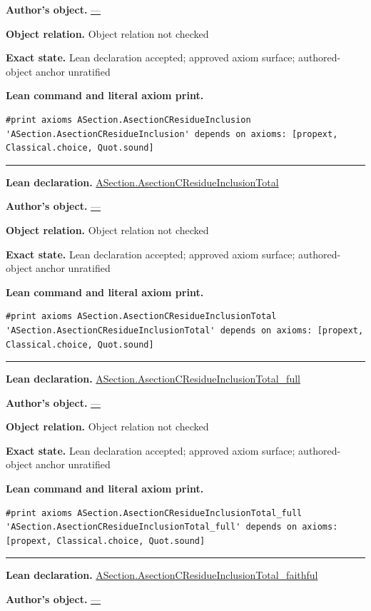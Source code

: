 \documentclass[11pt]{article}
\theoremstyle{plain}
\theoremstyle{definition}
\theoremstyle{remark}
\begin{document}
\begin{tcolorbox}[provenancecard,title={45. Definition - The residue subdiagram and its inclusion},title after break={45. Definition - The residue subdiagram and its inclusion (continued)}]
\par\textbf{Author's object.} \url{—}
\par\textbf{Object relation.} Object relation not checked
\par\textbf{Exact state.} Lean declaration accepted; approved axiom surface; authored-object anchor unratified
\par\smallskip\textbf{Lean command and literal axiom print.}
\begin{Verbatim}[breaklines=true,breakanywhere=true,fontsize=\small]
#print axioms ASection.AsectionCResidueInclusion
'ASection.AsectionCResidueInclusion' depends on axioms: [propext, Classical.choice, Quot.sound]
\end{Verbatim}
\medskip\hrule\medskip
\textbf{Lean declaration.} \url{ASection.AsectionCResidueInclusionTotal}
\par\textbf{Author's object.} \url{—}
\par\textbf{Object relation.} Object relation not checked
\par\textbf{Exact state.} Lean declaration accepted; approved axiom surface; authored-object anchor unratified
\par\smallskip\textbf{Lean command and literal axiom print.}
\begin{Verbatim}[breaklines=true,breakanywhere=true,fontsize=\small]
#print axioms ASection.AsectionCResidueInclusionTotal
'ASection.AsectionCResidueInclusionTotal' depends on axioms: [propext, Classical.choice, Quot.sound]
\end{Verbatim}
\medskip\hrule\medskip
\textbf{Lean declaration.} \url{ASection.AsectionCResidueInclusionTotal_full}
\par\textbf{Author's object.} \url{—}
\par\textbf{Object relation.} Object relation not checked
\par\textbf{Exact state.} Lean declaration accepted; approved axiom surface; authored-object anchor unratified
\par\smallskip\textbf{Lean command and literal axiom print.}
\begin{Verbatim}[breaklines=true,breakanywhere=true,fontsize=\small]
#print axioms ASection.AsectionCResidueInclusionTotal_full
'ASection.AsectionCResidueInclusionTotal_full' depends on axioms: [propext, Classical.choice, Quot.sound]
\end{Verbatim}
\medskip\hrule\medskip
\textbf{Lean declaration.} \url{ASection.AsectionCResidueInclusionTotal_faithful}
\par\textbf{Author's object.} \url{—}

\end{tcolorbox}
\end{document}
